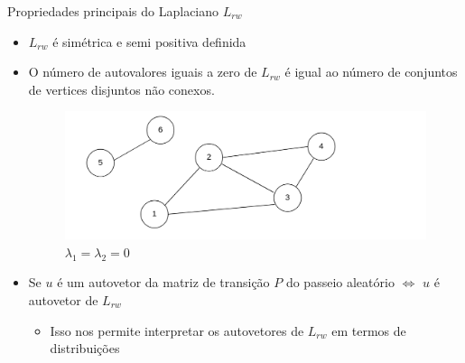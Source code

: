 \documentclass[11pt]{beamer}
\begin{document}
\begin{frame}{Propriedades principais do Laplaciano $L_{rw}$}

\begin{itemize}
\item $L_{rw}$ é simétrica e semi positiva definida

\vspace{.1cm}

\item O número de autovalores iguais a zero de $L_{rw}$ é igual ao número de conjuntos de vertices disjuntos não conexos.

\begin{figure}
\hspace*{2.3cm}\includegraphics[scale=0.15]{grafo2_pequeno}
\caption{$\lambda_1 = \lambda_2 = 0$}
\end{figure}

\item  Se $u$ é um autovetor da matriz de transição $P$ do passeio aleatório $\Leftrightarrow$ $u$ é autovetor de $L_{rw}$

\begin{itemize}
\item Isso nos permite interpretar os autovetores de $L_{rw}$ em termos de distribuições
\end{itemize}

\end{itemize}


\end{frame}
\end{document}
